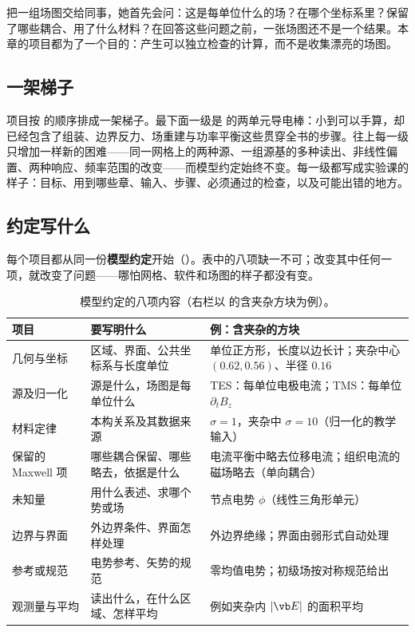 把一组场图交给同事，她首先会问：这是每单位什么的场？在哪个坐标系里？保留了哪些耦合、用了什么材料？在回答这些问题之前，一张场图还不是一个结果。本章的项目都为了一个目的：产生可以独立检查的计算，而不是收集漂亮的场图。

\subsection{一架梯子}
项目按 的顺序排成一架梯子。最下面一级是 的两单元导电棒：小到可以手算，却已经包含了组装、边界反力、场重建与功率平衡这些贯穿全书的步骤。往上每一级只增加一样新的困难——同一网格上的两种源、一组源基的多种读出、非线性偏置、两种响应、频率范围的改变——而模型约定始终不变。每一级都写成实验课的样子：目标、用到哪些章、输入、步骤、必须通过的检查，以及可能出错的地方。


\subsection{约定写什么}
每个项目都从同一份\textbf{模型约定}开始（）。表中的八项缺一不可；改变其中任何一项，就改变了问题——哪怕网格、软件和场图的样子都没有变。

\begin{table}[htbp]\centering\small
\caption{模型约定的八项内容（右栏以 的含夹杂方块为例）。}\label{tab:projects-contract}
\begin{tabularx}{\linewidth}{@{}>{\raggedright\arraybackslash}p{.17\linewidth} Y Y@{}}
\toprule
项目 & 要写明什么 & 例：含夹杂的方块\\\midrule
几何与坐标 & 区域、界面、公共坐标系与长度单位 & 单位正方形，长度以边长计；夹杂中心 $(0.62,0.56)$、半径 $0.16$\\
源及归一化 & 源是什么，场图是每单位什么 & TES：每单位电极电流；TMS：每单位 $\partial_tB_z$\\
材料定律 & 本构关系及其数据来源 & $\sigma=1$，夹杂中 $\sigma=10$（归一化的教学输入）\\
保留的 Maxwell 项 & 哪些耦合保留、哪些略去，依据是什么 & 电流平衡中略去位移电流；组织电流的磁场略去（单向耦合）\\
未知量 & 用什么表述、求哪个势或场 & 节点电势 $\phi$（线性三角形单元）\\
边界与界面 & 外边界条件、界面怎样处理 & 外边界绝缘；界面由弱形式自动处理\\
参考或规范 & 电势参考、矢势的规范 & 零均值电势；初级场按对称规范给出\\
观测量与平均 & 读出什么，在什么区域、怎样平均 & 例如夹杂内 $|\vb E|$ 的面积平均\\
\bottomrule
\end{tabularx}
\end{table}

